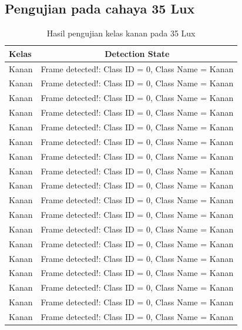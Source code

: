 \subsection{Pengujian pada cahaya 35 Lux}
\begin{longtable}{|l|c|}
  \caption{Hasil pengujian kelas kanan pada 35 Lux}
  \label{tb:luxkanan} \\
  \hline
  \rowcolor[HTML]{C0C0C0} 
  \textbf{Kelas} & \textbf{Detection State}                           \\ \hline
  Kanan          & Frame detected!: Class ID = 0, Class Name = Kanan \\ \hline
  Kanan          & Frame detected!: Class ID = 0, Class Name = Kanan \\ \hline
  Kanan          & Frame detected!: Class ID = 0, Class Name = Kanan \\ \hline
  Kanan          & Frame detected!: Class ID = 0, Class Name = Kanan \\ \hline
  Kanan          & Frame detected!: Class ID = 0, Class Name = Kanan \\ \hline
  Kanan          & Frame detected!: Class ID = 0, Class Name = Kanan \\ \hline
  Kanan          & Frame detected!: Class ID = 0, Class Name = Kanan \\ \hline
  Kanan          & Frame detected!: Class ID = 0, Class Name = Kanan \\ \hline
  Kanan          & Frame detected!: Class ID = 0, Class Name = Kanan \\ \hline
  Kanan          & Frame detected!: Class ID = 0, Class Name = Kanan \\ \hline
  Kanan          & Frame detected!: Class ID = 0, Class Name = Kanan \\ \hline
  Kanan          & Frame detected!: Class ID = 0, Class Name = Kanan \\ \hline
  Kanan          & Frame detected!: Class ID = 0, Class Name = Kanan \\ \hline
  Kanan          & Frame detected!: Class ID = 0, Class Name = Kanan \\ \hline
  Kanan          & Frame detected!: Class ID = 0, Class Name = Kanan \\ \hline
  Kanan          & Frame detected!: Class ID = 0, Class Name = Kanan \\ \hline
  Kanan          & Frame detected!: Class ID = 0, Class Name = Kanan \\ \hline
  Kanan          & Frame detected!: Class ID = 0, Class Name = Kanan \\ \hline

\end{longtable}
